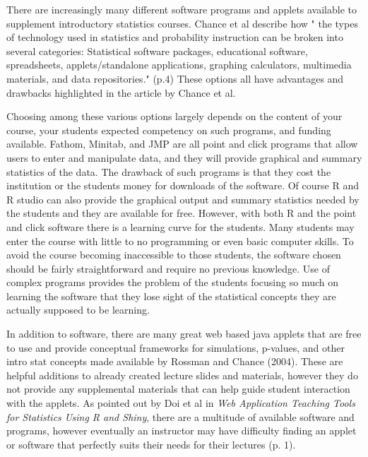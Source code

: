 \documentclass[11pt]{book}
\begin{document}
There are increasingly many different software programs and applets available to supplement introductory statistics courses.  Chance et al describe how " the types of technology used in statistics and probability instruction can be broken into several categories: Statistical software packages, educational software, spreadsheets, applets/standalone applications, graphing calculators, multimedia materials, and data repositories." (p.4) These options all have advantages and drawbacks highlighted in the article by Chance et al.  


Choosing among these various options largely depends on the content of your course, your students expected competency on such programs, and funding available.  Fathom, Minitab, and JMP are all point and click programs that allow users to enter and manipulate data, and they will provide graphical and summary statistics of the data.  The drawback of such programs is that they cost the institution or the students money for downloads of the software.  Of course R and R studio can also provide the graphical output and summary statistics needed by the students and they are available for free.  However, with both R and the point and click software there is a learning curve for the students.    Many students may enter the course with little to no programming or even basic computer skills.   To avoid the course becoming inaccessible to those students, the software chosen should be fairly straightforward and require no previous knowledge.   Use of complex programs provides the problem of the students focusing so much on learning the software that they lose sight of the statistical concepts they are actually supposed to be learning.  

 In addition to software, there are many great web based java applets that are free to use and provide conceptual frameworks for simulations, p-values, and other intro stat concepts made available by Rossman and Chance (2004).  These are helpful additions to already created lecture slides and materials, however they do not provide any supplemental materials that can help guide student interaction with the applets.  As pointed out by Doi et al in \emph{Web Application Teaching Tools for Statistics Using R and Shiny}, there are a multitude of available software and programs, however eventually an instructor may have difficulty finding an applet or software that perfectly suits their needs for their lectures (p. 1).
 
\end{document}
